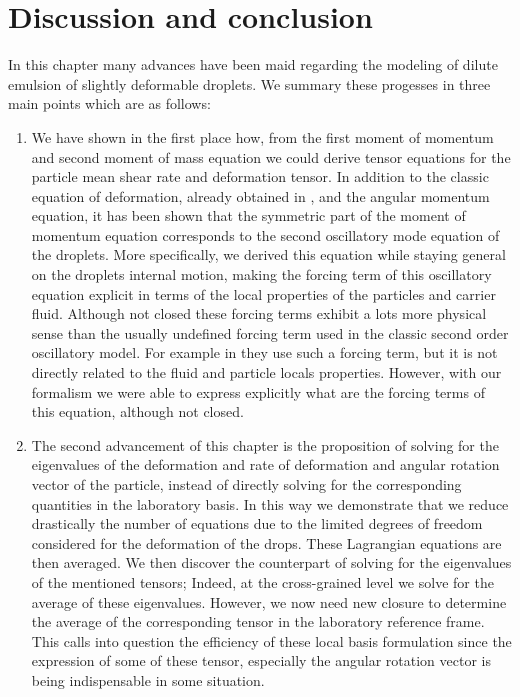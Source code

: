 \section{Discussion and conclusion}

In this chapter many advances have been maid regarding the modeling of dilute emulsion of slightly deformable droplets. 
We summary these progesses in three main points which are as follows: 
\begin{enumerate}
    \item We have shown in the first place how, from the first moment of momentum and second moment of mass equation we could derive tensor equations for the particle mean shear rate and deformation tensor. 
In addition to the classic equation of deformation, already obtained in \citet{goddard1967nonlinear},  and the angular momentum equation, it has been shown that the symmetric part of the moment of momentum equation corresponds to the second oscillatory mode equation of the droplets. 
More specifically, we derived this equation while staying general on the droplets internal motion, making the forcing term of this oscillatory equation explicit in terms of the local properties of the particles and carrier fluid. 
Although not closed these forcing terms exhibit a lots more physical sense than the usually undefined  forcing term used in the classic second order oscillatory model.
For example in \citet{riviere2021sub} they  use such a forcing term, but it is not directly related to the fluid and particle locals properties.
However, with our formalism we were able to express explicitly what are the forcing terms of this equation, although not closed. 

\item 
The second advancement of this chapter is the proposition of solving for the eigenvalues of the deformation and rate of deformation and angular rotation vector of the particle, instead of directly solving for the corresponding quantities in the laboratory basis. 
In this way we demonstrate that we reduce drastically the number of equations due to the limited degrees of freedom considered for the deformation of the drops. 
These Lagrangian equations are then averaged. 
We then discover the counterpart of solving for the eigenvalues of the mentioned tensors; 
Indeed, at the cross-grained level we solve for the average of these eigenvalues. 
However, we now need new closure to determine the average of the corresponding tensor in the laboratory reference frame.  
This calls into question the efficiency of these local basis formulation since the expression of some of these tensor, especially the angular rotation vector is being indispensable in some situation. 


\end{enumerate}
